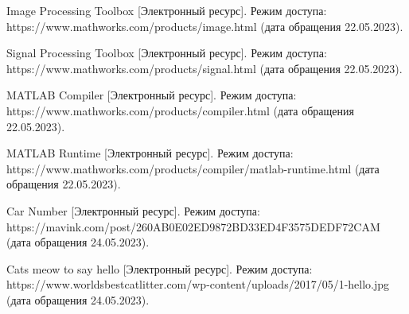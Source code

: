 \begin{thebibliography}{3}
    Image Processing Toolbox [Электронный ресурс]. Режим доступа: https://www.mathworks.com/products/image.html (дата обращения 22.05.2023).
    
    Signal Processing Toolbox [Электронный ресурс]. Режим доступа: https://www.mathworks.com/products/signal.html (дата обращения 22.05.2023).

    MATLAB Compiler [Электронный ресурс]. Режим доступа: https://www.mathworks.com/products/compiler.html (дата обращения 22.05.2023).

    MATLAB Runtime [Электронный ресурс]. Режим доступа: https://www.mathworks.com/products/compiler/matlab-runtime.html (дата обращения 22.05.2023).

    Car Number [Электронный ресурс]. Режим доступа: https://mavink.com/post/260AB0E02ED9872BD33ED4F3575DEDF72CAM (дата обращения 24.05.2023).

    Cats meow to say hello [Электронный ресурс]. Режим доступа: https://www.worldsbestcatlitter.com/wp-content/uploads/2017/05/1-hello.jpg (дата обращения 24.05.2023).
    
\end{thebibliography}
